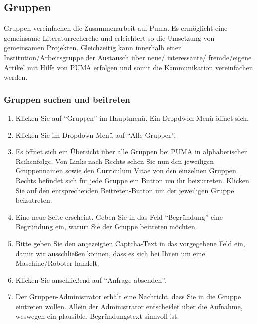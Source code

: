 \documentclass[b5paper,11pt,twoside]{scrbook} %
\begin{document}
\subsection{Gruppen}
Gruppen vereinfachen die Zusammenarbeit auf Puma. Es ermöglicht eine gemeinsame Literaturrecherche und erleichtert so die Umsetzung von gemeinsamen Projekten. Gleichzeitig kann innerhalb einer Institution/Arbeitsgruppe der Austausch über neue/ interessante/ fremde/eigene Artikel mit Hilfe von PUMA erfolgen und somit die Kommunikation vereinfachen werden. 
\subsubsection{Gruppen suchen und beitreten}%
\begin{enumerate}
    \item Klicken Sie auf \enquote{Gruppen} im Hauptmenü. Ein Dropdwon-Menü öffnet sich.
    \item Klicken Sie im Dropdown-Menü auf \enquote{Alle Gruppen}.
    \item Es öffnet sich ein Übersicht über alle Gruppen bei PUMA in alphabetischer Reihenfolge. Von Links nach Rechts sehen Sie nun den jeweiligen Gruppennamen sowie den Curriculum Vitae von den einzelnen Gruppen. Rechts befindet sich für jede Gruppe ein Button um ihr beizutreten. Klicken Sie auf den entsprechenden Beitreten-Button um der jeweiligen Gruppe beizutreten.
    \item Eine neue Seite erscheint. Geben Sie in das Feld \enquote{Begründung} eine Begründung ein, warum Sie der Gruppe beitreten möchten.
    \item Bitte geben Sie den angezeigten Captcha-Text in das vorgegebene Feld ein, damit wir ausschließen können, dass es sich bei Ihnen um eine Maschine/Roboter handelt.
    \item Klicken Sie anschließend auf \enquote{Anfrage absenden}.
    \item Der Gruppen-Administrator erhält eine Nachricht, dass Sie in die Gruppe eintreten wollen. Allein der Administrator entscheidet über die Aufnahme, weswegen ein plausibler Begründungstext sinnvoll ist.
\end{enumerate}
\end{document}
